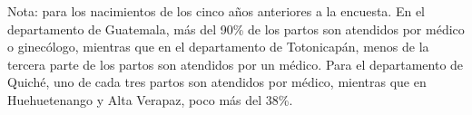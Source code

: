 Nota: para los nacimientos de los cinco años anteriores a la encuesta. En el departamento de Guatemala, más del 90\% de los partos son atendidos por médico o ginecólogo, mientras que en el departamento de Totonicapán, menos de la tercera parte de los partos son atendidos por un médico. Para el departamento de Quiché, uno de cada tres partos son atendidos por médico, mientras que en Huehuetenango y Alta Verapaz, poco más del 38\%.